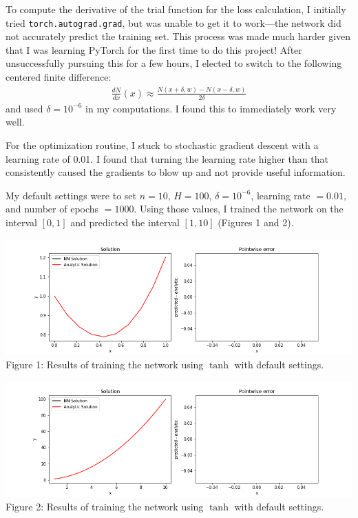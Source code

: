 \documentclass{letter}
\begin{document}
{    To compute the derivative of the trial function for the loss calculation, I initially tried \texttt{torch.autograd.grad}, but was unable to get it to work---the network did not accurately predict the training set. This process was made much harder given that I was learning PyTorch for the first time to do this project! After unsuccessfully pursuing this for a few hours, I elected to switch to the following centered finite difference: \begin{align*}
        \frac{dN}{dx}(x) \approx \frac{N(x+\delta, w) - N(x-\delta, w)}{2\delta}
    \end{align*} and used $\delta = 10^{-6}$ in my computations. I found this to immediately work very well.
    
    For the optimization routine, I stuck to stochastic gradient descent with a learning rate of 0.01. I found that turning the learning rate higher than that consistently caused the gradients to blow up and not provide useful information.
    
    My default settings were to set $n = 10$, $H = 100$, $\delta = 10^{-6}$, learning rate $= 0.01$, and number of epochs $= 1000$. Using those values, I trained the network on the interval $[0,1]$ and predicted the interval $[1, 10]$ (Figures 1 and 2).

    \begin{center}
        \includegraphics[scale=0.6]{code/train.png} \\
        Figure 1: Results of training the network using $\tanh$ with default settings.
    \end{center}
    
    \begin{center}
        \includegraphics[scale=0.6]{code/predict.png} \\
        Figure 2: Results of training the network using $\tanh$ with default settings.
    \end{center}
    
}
\end{document}
